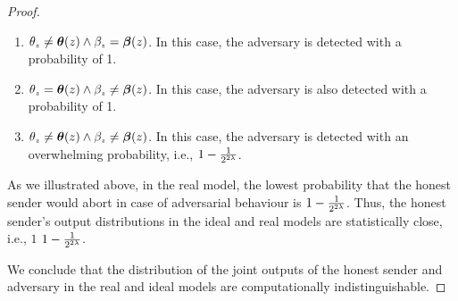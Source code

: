 \begin{proof}
\begin{enumerate}
%
\item $\theta_{\scriptscriptstyle z}\neq \bm\theta(z) \wedge  \beta_{\scriptscriptstyle  z}={\bm\beta}( z)$. In this case, the adversary is detected with a probability of 1. 
%
\item $\theta_{\scriptscriptstyle z}= \bm\theta(z) \wedge  \beta_{\scriptscriptstyle  z}\neq {\bm\beta}( z)$.  In this case, the adversary is also detected with a probability of 1.
%
\item $\theta_{\scriptscriptstyle z}\neq \bm\theta(z) \wedge  \beta_{\scriptscriptstyle  z} \neq {\bm\beta}( z)$. In this case, the adversary is detected with an overwhelming probability, i.e., $1-\frac{1}{2^{\scriptscriptstyle 2\lambda}}$. 
%
\end{enumerate}

As we illustrated above, in the real model, the lowest probability that the honest sender would abort in case of adversarial behaviour is $1-\frac{1}{2^{\scriptscriptstyle 2\lambda}}$. Thus, the honest sender's output distributions in the ideal and real models are statistically close, i.e., $1$  $1-\frac{1}{2^{\scriptscriptstyle 2\lambda}}$. 

We conclude that the distribution of the joint outputs of the honest sender and adversary in the real and ideal models are computationally indistinguishable. 
%
  \end{proof}
  
  
  
  
  
  
  
  
  
  
  
  